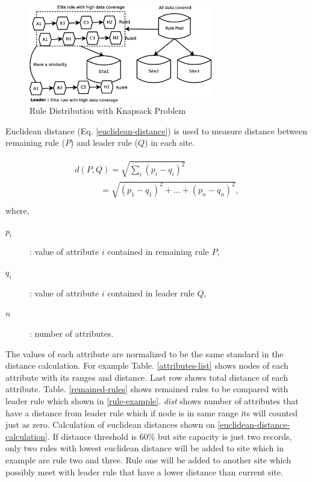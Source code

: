 \documentclass[fleqn,10pt,twocolumn]{SICE14}
\begin{document}
\begin{figure}[tb]
\includegraphics[width=8cm]{knapsack}
\caption{\label{knapsack} Rule Distribution with Knapsack Problem}
\end{figure}

Euclidean distance (Eq. \ref{euclidean-distance}) \cite{euclidean-distance} is used to measure distance between remaining rule ($P$) and leader rule ($Q$) in each site. 

\begin{eqnarray}
\begin{array}{lll}
d(P,Q)=\sqrt{\underset{i}{\sum}(p_{i}-q_{i})^{2}} \\
\qquad\quad=\sqrt{(p_{1}-q_{1})^{2}+...+(p_{n}-q_{n})^{2}}, \\
\end{array}
\label{euclidean-distance}
\end{eqnarray}
where,

\begin{description}
\item [${p_{i}}$] : value of attribute $i$ contained in remaining rule $P$,
\item [${q_{i}}$] : value of attribute $i$ contained in leader rule $Q$,
\item [${n}$] : number of attributes.
\end{description}

The values of each attribute are normalized to be the same standard in the distance calculation. For example Table. \ref{attributes-list} shows nodes of each attribute with its ranges and distance. Last row shows total distance of each attribute. Table. \ref{remained-rules} shows remained rules to be compared with leader rule which shown in \ref{rule-example}. {\it dist} shows number of attributes that have a distance from leader rule which if node is in same range its will counted just as zero. Calculation of euclidean distances shown on \ref{euclidean-distance-calculation}. If distance threshold is 60\% but site capacity is just two records, only two rules with lowest euclidean distance will be added to site which in example are rule two and three. Rule one will be added to another site which possibly meet with leader rule that have a lower distance than current site. 
\end{document}
